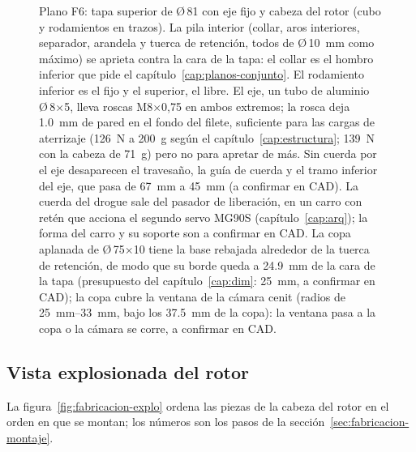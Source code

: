 \begin{figure}[H]
\caption{Plano F6: tapa superior de Ø\,81 con eje fijo y cabeza del rotor (cubo y rodamientos en
trazos). La pila interior (collar, aros interiores, separador, arandela y tuerca de retención, todos de
Ø\,\SI{10}{mm} como máximo) se aprieta contra la cara de la tapa: el collar es el hombro inferior que pide
el capítulo~\ref{cap:planos-conjunto}. El rodamiento inferior es el fijo y el superior, el libre. El eje, un
tubo de aluminio Ø\,8$\times$5, lleva roscas M8$\times$0,75 en ambos extremos; la rosca deja
\SI{1.0}{mm} de pared en el fondo del filete, suficiente para las cargas de aterrizaje (\SI{126}{N} a
\SI{200}{g} según el capítulo~\ref{cap:estructura}; \SI{139}{N} con la cabeza de \SI{71}{g}) pero no para
apretar de más. Sin cuerda por el eje desaparecen el travesaño, la guía de cuerda y el tramo inferior del
eje, que pasa de \SI{67}{mm} a \SI{45}{mm} (a confirmar en CAD). La cuerda del drogue sale del pasador de
liberación, en un carro con retén que acciona el segundo servo MG90S (capítulo~\ref{cap:arq}); la forma del
carro y su soporte son a confirmar en CAD. La copa aplanada de Ø\,75$\times$10 tiene la base rebajada
alrededor de la tuerca de retención, de modo que su borde queda a \SI{24.9}{mm} de la cara de la tapa
(presupuesto del capítulo~\ref{cap:dim}: \SI{25}{mm}, a confirmar en CAD); la copa cubre la ventana de la cámara cenit
(radios de \SIrange{25}{33}{mm}, bajo los \SI{37.5}{mm} de la copa): la ventana pasa a la copa o la cámara se
corre, a confirmar en CAD.}
\label{fig:fabricacion-tapa}
\end{figure}

\subsection{Vista explosionada del rotor}\label{sec:fabricacion-explo}

La figura~\ref{fig:fabricacion-explo} ordena las piezas de la cabeza del rotor en el orden en
que se montan; los números son los pasos de la sección~\ref{sec:fabricacion-montaje}.

\newcommand{\fabcil}[6]{%
  \filldraw[fill=#5, draw=#6, line width=0.4pt] ({#1-#3},{#2}) -- ({#1-#3},{#2+#4})
     -- ({#1+#3},{#2+#4}) -- ({#1+#3},{#2})
     arc[start angle=0, end angle=-180, x radius={#3}, y radius={0.32*#3}] -- cycle;
  \filldraw[fill=#5, draw=#6, line width=0.4pt] ({#1},{#2+#4}) ellipse [x radius={#3}, y radius={0.32*#3}];
  \fill[white, opacity=0.45] ({#1},{#2+#4}) ellipse [x radius={#3}, y radius={0.32*#3}];}
\newcommand{\fabpaso}[2]{\node[circle, draw=black, fill=white, font=\scriptsize\bfseries, inner sep=0.8pt, minimum size=4.2mm] at (#1) {#2};}

